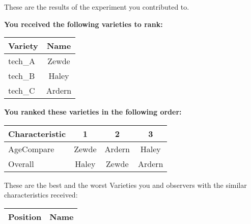\documentclass[10pt]{article}
\begin{document}
\begin{titlepage}
	These are the results of the experiment you contributed to.

	\begin{flushleft}
		\textbf{You received the following varieties to rank: }\hfill \break
		\begin{tabularx}{\textwidth}{ X | c  }
			\hline
			\textbf{Variety} & \textbf{Name} \\ \hline

			
				tech\_A & Zewde \\ \hline
			
				tech\_B & Haley \\ \hline
			
				tech\_C & Ardern \\ \hline
			


		\end{tabularx}\newline \newline

		\textbf{You ranked these varieties in the following order: }\hfill \break
		\begin{tabularx}{\textwidth}{ X | c | c | c  }
			\hline
			\textbf{Characteristic}
			
				& \textbf{ 1 }
			
				& \textbf{ 2 }
			
				& \textbf{ 3 }
			
			\\ \hline


			
				AgeCompare & Zewde  & Ardern  & Haley  \\ \hline


			
				Overall & Haley  & Zewde  & Ardern  \\ \hline


			

		\end{tabularx}

	\end{flushleft}

	\pagebreak

	\begin{flushleft}
		These are the best and the worst Varieties you and observers with the similar characteristics received:\hfill \break \newline
		\begin{tabularx}{\textwidth}{ X | X  }
			\hline
			\textbf{Position} & \textbf{Name} \\ \hline


\end{tabularx}
\end{flushleft}
\end{titlepage}
\end{document}
